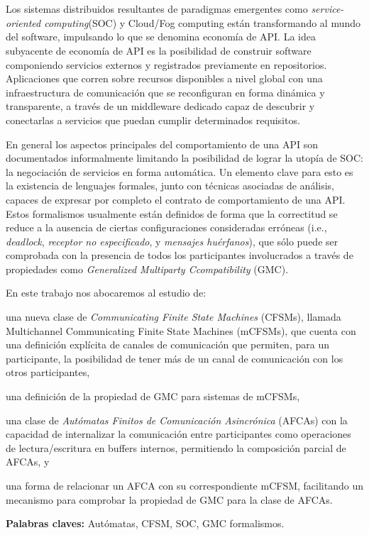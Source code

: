 \chapter*{\runtitulo}

Los sistemas distribuidos resultantes de paradigmas emergentes como \emph{service-oriented computing}(SOC) y Cloud/Fog computing están transformando al mundo del software, impulsando lo que se denomina economía de API. La idea subyacente de economía de API es la posibilidad de construir software componiendo servicios externos y registrados previamente en repositorios. Aplicaciones que corren sobre recursos disponibles a nivel global con una infraestructura de comunicación que se reconfiguran en forma dinámica y transparente, a través de un middleware dedicado capaz de descubrir y conectarlas a servicios que puedan cumplir determinados requisitos. 

En general los aspectos principales del comportamiento de una API son documentados informalmente limitando la posibilidad de lograr la utopía de SOC: la negociación de servicios en forma automática. Un elemento clave para esto es la existencia de lenguajes formales, junto con técnicas asociadas de análisis, capaces de expresar por completo el contrato de comportamiento de una API. Estos formalismos usualmente están definidos de forma que la correctitud se reduce a la ausencia de ciertas configuraciones consideradas erróneas (i.e., \emph{deadlock}, \emph{receptor no especificado}, y \emph{mensajes huérfanos}), que sólo puede ser comprobada con la presencia de todos los participantes involucrados a través de propiedades como \emph{Generalized Multiparty Ccompatibility} (GMC).

En este trabajo nos abocaremos al estudio de: 
\begin{inparaenum}[1)] 
\item una nueva clase de \emph{Communicating Finite State Machines} (CFSMs), llamada Multichannel Communicating Finite State Machines (mCFSMs), que cuenta con una definición explícita de canales de comunicación que permiten, para un participante, la posibilidad de tener más de un canal de comunicación con los otros participantes, 
\item una definición de la propiedad de GMC para sistemas de mCFSMs,
\item una clase de \emph{Autómatas Finitos de Comunicación Asincrónica} (AFCAs) con la capacidad de internalizar la comunicación entre participantes como operaciones de lectura/escritura en buffers internos, permitiendo la composición parcial de AFCAs, y
\item una forma de relacionar un AFCA con su correspondiente mCFSM, facilitando un mecanismo para comprobar la propiedad de GMC para la clase de AFCAs.
\end{inparaenum}

\bigskip

\noindent\textbf{Palabras claves:} Autómatas, CFSM, SOC, GMC formalismos.